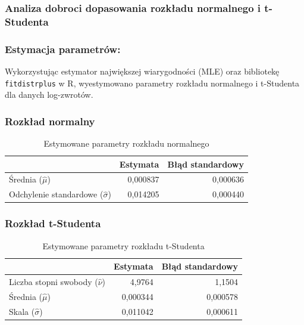 \documentclass[a4paper,11pt]{article}
\begin{document}
\subsubsection{Analiza dobroci dopasowania rozkładu normalnego i t-Studenta}

\subsubsection{Estymacja parametrów:}

Wykorzystując estymator największej wiarygodności (MLE) oraz bibliotekę \texttt{fitdistrplus} w R, wyestymowano parametry rozkładu normalnego i t-Studenta dla danych log-zwrotów.

\subsubsection{Rozkład normalny}

\begin{table}[H]
    \centering
    \begin{tabular}{|l|r|r|}
        \hline
        & \textbf{Estymata} & \textbf{Błąd standardowy} \\
        \hline
        Średnia ($\hat{\mu}$) & 0,000837 & 0,000636 \\
        Odchylenie standardowe ($\hat{\sigma}$) & 0,014205 & 0,000440 \\
        \hline
    \end{tabular}
    \caption{Estymowane parametry rozkładu normalnego}
    \label{tab:fit_norm}
\end{table}

\subsubsection{Rozkład t-Studenta}

\begin{table}[H]
    \centering
    \begin{tabular}{|l|r|r|}
        \hline
        & \textbf{Estymata} & \textbf{Błąd standardowy} \\
        \hline
        Liczba stopni swobody ($\hat{\nu}$) & 4,9764 & 1,1504 \\
        Średnia ($\hat{\mu}$) & 0,000344 & 0,000578 \\
        Skala ($\hat{\sigma}$) & 0,011042 & 0,000611 \\
        \hline
    \end{tabular}
    \caption{Estymowane parametry rozkładu t-Studenta}
    \label{tab:fit_t}
\end{table}
\end{document}
